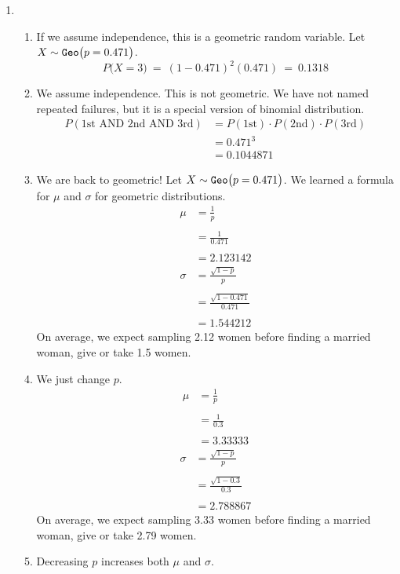 \documentclass[12pt,letterpaper]{article}
\begin{document}
\begin{enumerate}
\item \begin{enumerate}
\item If we assume independence, this is a geometric random variable. Let $X\sim \texttt{Geo}\big(p=0.471\big)$.
$$P\big(X=3\big) ~=~ (1-0.471)^2(0.471) ~=~ 0.1318 $$
\item We assume independence. This is not geometric. We have not named repeated failures, but it is a special version of binomial distribution.
\begin{align*}
P(\text{1st AND 2nd AND 3rd}) &= P(\text{1st}) \cdot P(\text{2nd}) \cdot P(\text{3rd}) \\
&= 0.471^3 \\
&= 0.1044871
\end{align*}
\item We are back to geometric! Let $X\sim \texttt{Geo}\big(p=0.471\big)$. We learned a formula for $\mu$ and $\sigma$ for geometric distributions.
\begin{align*}
\mu &= \frac{1}{p} \\\\
 &= \frac{1}{0.471} \\\\
 &= 2.123142
\end{align*}
\begin{align*}
\sigma &= \frac{\sqrt{1-p}}{p} \\\\
 &= \frac{\sqrt{1-0.471}}{0.471} \\ \\
 &= 1.544212
\end{align*}
On average, we expect sampling 2.12 women before finding a married woman, give or take 1.5 women.

\item We just change $p$.
\begin{align*}
\mu &= \frac{1}{p} \\\\
 &= \frac{1}{0.3} \\\\
 &= 3.33333
\end{align*}
\begin{align*}
\sigma &= \frac{\sqrt{1-p}}{p} \\\\
 &= \frac{\sqrt{1-0.3}}{0.3} \\ \\
 &= 2.788867
\end{align*}
On average, we expect sampling 3.33 women before finding a married woman, give or take 2.79 women.
\item Decreasing $p$ increases both $\mu$ and $\sigma$.
\end{enumerate}


\end{enumerate}
\end{document}
